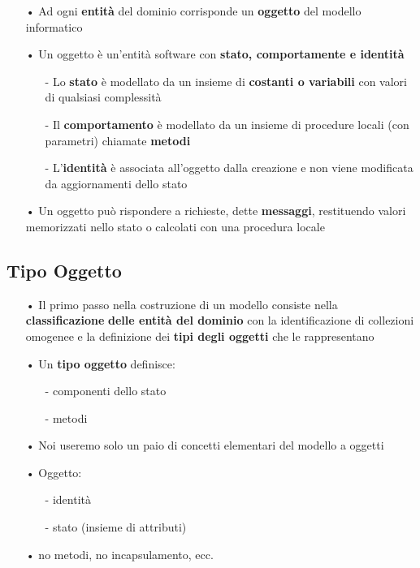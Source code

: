 \documentclass[12pt, letterpaper]{article}
\begin{document}
\begin{itemize}
   \item[•] Ad ogni \textbf{entità} del dominio corrisponde un \textbf{oggetto} del modello informatico 
   \item[•] Un oggetto è un'entità software con \textbf{stato, comportamente e identità}
      \begin{itemize}
         \item[-] Lo \textbf{stato} è modellato da un insieme di \textbf{costanti o variabili} con valori di qualsiasi 
            complessità
         \item[-] Il \textbf{comportamento} è modellato da un insieme di procedure locali (con parametri) chiamate \textbf{metodi} 
         \item[-] L'\textbf{identità} è associata all'oggetto dalla creazione e non viene modificata da aggiornamenti dello stato 
      \end{itemize}
   \item[•] Un oggetto può rispondere a richieste, dette \textbf{messaggi}, restituendo valori memorizzati 
      nello stato o calcolati con una procedura locale 
\end{itemize}

\subsection{Tipo Oggetto}

\begin{itemize}
   \item[•] Il primo passo nella costruzione di un modello consiste nella \textbf{classificazione}
      \textbf{delle entità del dominio} con la identificazione di collezioni omogenee e la
      definizione dei \textbf{tipi degli oggetti} che le rappresentano
   \item[•] Un \textbf{tipo oggetto} definisce:
      \begin{itemize}
         \item[-] componenti dello stato 
         \item[-] metodi
      \end{itemize}
   \item[•] Noi useremo solo un paio di concetti elementari del modello a oggetti
   \item[•] Oggetto:
      \begin{itemize}
         \item[-] identità
         \item[-] stato (insieme di attributi)
      \end{itemize}
   \item[•] no metodi, no incapsulamento, ecc.
\end{itemize}
\end{document}
